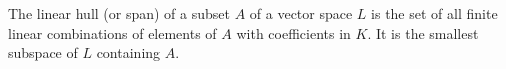 The linear hull (or span) of a subset $A$ of a vector space $L$ is the set of all finite linear combinations of elements of $A$ with coefficients in $K$. It is the smallest subspace of $L$ containing $A$.
